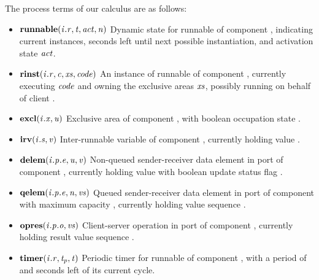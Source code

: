 \documentclass[twocolumn]{article}
\begin{document}
The process terms of our calculus are as follows:
\begin{itemize}
\item $\Trunnable{\Tr{\V{R}}{\V{I}}}{\V{T}}{\Act}{\V{N}}$  \newline
Dynamic state for runnable  of component , indicating  current instances,  seconds left until next possible instantiation, and activation state $\Act$.
\item $\Trinst{\Tr{\V{R}}{\V{I}}}{\V{C}}{\Xs}{\Code}$ \newline
An instance of runnable  of component , currently executing $\Code$ and owning the exclusive areas $\Xs$, possibly running on behalf of client .
\item $\Texcl{\Tx{\V{X}}{\V{I}}}{\V{U}}$ \newline
Exclusive area  of component , with boolean occupation state .
\item $\Tirv{\Ts{\V{S}}{\V{I}}}{\V{V}}$ \newline
Inter-runnable variable  of component , currently holding value .
\item $\Tdelem{\Tep{\V{E}}{\V{P}}{\V{I}}}{\V{U}}{\V{V}}$ \newline
Non-queued sender-receiver data element  in port  of component , currently holding value  with boolean update status flag .
\item $\Tqelem{\Tep{\V{E}}{\V{P}}{\V{I}}}{\V{N}}{\Vs}$ \newline
Queued sender-receiver data element  in port  of component  with maximum capacity , currently holding value sequence \Vs.
\item $\Topres{\Top{\V{O}}{\V{P}}{\V{I}}}{\Vs}$ \newline
Client-server operation  in port  of component , currently holding result value sequence \Vs.
\item $\Ttimer{\Tr{\V{R}}{\V{I}}}{\V{T_p}}{\V{T}}$ \newline
Periodic timer for runnable  of component , with a period of  and  seconds left of its current cycle.
\end{itemize}
\end{document}
